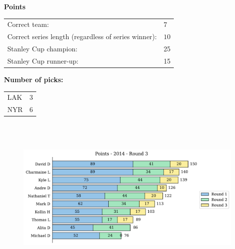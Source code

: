 \documentclass[10pt]{article}
\begin{document}
{\bf Points}\\
\begin{minipage}[t]{12cm}
    \vspace{0pt}
    \begin{tabular}{l l}
        Correct team:	& $7$\\
        Correct series length (regardless of series winner):	& $10$\\
        Stanley Cup champion:	& 25\\
        Stanley Cup runner-up:	& 15\\
    \end{tabular}

    \vspace{0.5cm}
    {\bf Number of picks:}\\
    \begin{tabular}{lc }
        LAK & 3 \\
        NYR & 6 \\
    \end{tabular}
\end{minipage}
%
\begin{minipage}[t]{13cm}
    \vspace{0pt}
    \begin{figure}[H]
        \vspace{-1cm}
        \includegraphics[width=12cm,height=8cm,keepaspectratio]{../../figures/2014/Points-2014-Round3.pdf}
    \end{figure}
\end{minipage}
\end{document}
